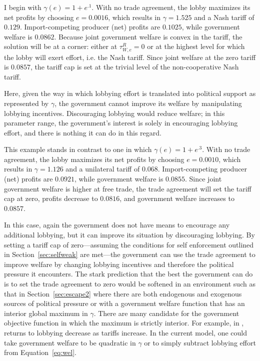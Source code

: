 \documentclass[12pt]{article}
\newcommand{\ga}{\gamma}
\begin{document}
I begin with $\ga(e) = 1 + e^{.1}$. With no trade agreement, the lobby maximizes its net profits by choosing $e=0.0016$, which results in $\ga=1.525$ and a Nash tariff of $0.129$. Import-competing producer (net) profits are $0.1025$, while government welfare is $0.0862$. Because joint government welfare is convex in the tariff, the solution will be at a corner: either at $\tau^R_{W,e} =0$ or at the highest level for which the lobby will exert effort, i.e. the Nash tariff. Since joint welfare at the zero tariff is $0.0857$, the tariff cap is set at the trivial level of the non-cooperative Nash tariff. 

Here, given the way in which lobbying effort is translated into political support as represented by $\ga$, the government cannot improve its welfare by manipulating lobbying incentives. Discouraging lobbying would reduce welfare; in this parameter range, the government's interest is solely in encouraging lobbying effort, and there is nothing it can do in this regard.


This example stands in contrast to one in which $\ga(e) = 1 + e^{.3}$. With no trade agreement, the lobby maximizes its net profits by choosing $e=0.0010$, which results in $\ga=1.126$ and a unilateral tariff of $0.068$. Import-competing producer (net) profits are $0.0921$, while government welfare is $0.0855$. Since joint government welfare is higher at free trade, the trade agreement will set the tariff cap at zero, profits decrease to $0.0816$, and government welfare increases to $0.0857$.

In this case, again the government does not have means to encourage any additional lobbying, but it can improve its situation by discouraging lobbying. By setting a tariff cap of zero---assuming the conditions for self enforcement outlined in Section~\ref{sec:selfweak} are met---the government can use the trade agreement to improve welfare by changing lobbying incentives and therefore the political pressure it encounters. The stark prediction that the best the government can do is to set the trade agreement to zero would be softened in an environment such as that in Section~\ref{sec:escape2} where there are both endogenous and exogenous sources of political pressure or with a government welfare function that has an interior global maximum in $\ga$. There are many candidate for the government objective function in which the maximum is strictly interior. For example, in \Textcite{ethier2012}, returns to lobbying decrease as tariffs increase. In the current model, one could take government welfare to be quadratic in $\ga$ or to simply subtract lobbying effort from Equation~\ref{eq:wel}. 
\end{document}
